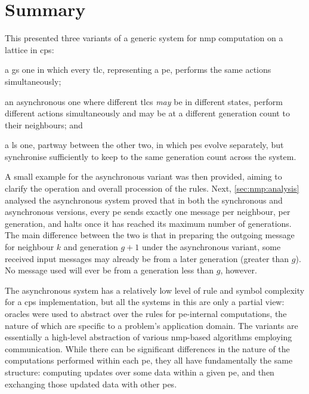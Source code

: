 \section{Summary}
This  presented three variants of a generic system for \gls{nmp} computation on a lattice in \gls{cps}:
\begin{inparaenum}[(i)]
\item a \gls{gs} one in which every \gls{tlc}, representing a \gls{pe}, performs the same actions simultaneously;
\item an asynchronous one where different \glspl{tlc} \emph{may} be in different states, perform different actions simultaneously and may be at a different generation count to their neighbours; and
\item a \gls{ls} one, partway between the other two, in which \glspl{pe} evolve separately, but synchronise sufficiently to keep to the same generation count across the system.
\end{inparaenum}

A small example for the asynchronous variant was then provided, aiming to clarify the operation and overall procession of the rules.  Next, \cref{sec:nmp:analysis} analysed the asynchronous system proved that in both the synchronous and asynchronous versions, every \gls{pe} sends exactly one message per neighbour, per generation, and halts once it has reached its maximum number of generations.  The main difference between the two is that in preparing the outgoing message for neighbour \(k\) and generation \(g + 1\) under the asynchronous variant, some received input messages may already be from a later generation (greater than \(g\)).  No message used will ever be from a generation less than \(g\), however.

The asynchronous system has a relatively low level of rule and symbol complexity for a \gls{cps} implementation, but all the systems in this  are only a partial view:  oracles were used to abstract over the rules for \gls{pe}-internal computations, the nature of which are specific to a problem's application domain.  The variants are essentially a high-level abstraction of various \gls{nmp}-based algorithms employing communication.  While there can be significant differences in the nature of the computations performed within each \gls{pe}, they all have fundamentally the same structure:  computing updates over some data within a given \gls{pe}, and then exchanging those updated data with other \glspl{pe}.

